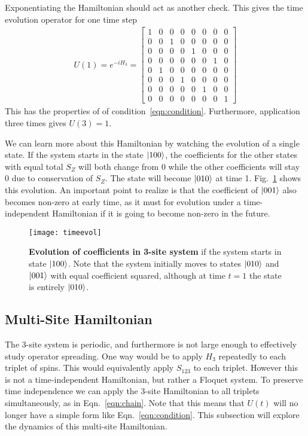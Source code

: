 Exponentiating the Hamiltonian should act as another check. This gives the time evolution operator for one time step
\begin{align}
U(1) = e^{-iH_3} = \begin{bmatrix}
1 & 0 & 0 & 0 & 0 & 0 & 0 & 0 \\
0 & 0 & 1 & 0 & 0 & 0 & 0 & 0 \\
0 & 0 & 0 & 0 & 1 & 0 & 0 & 0 \\
0 & 0 & 0 & 0 & 0 & 0 & 1 & 0 \\
0 & 1 & 0 & 0 & 0 & 0 & 0 & 0 \\
0 & 0 & 0 & 1 & 0 & 0 & 0 & 0 \\
0 & 0 & 0 & 0 & 0 & 1 & 0 & 0 \\
0 & 0 & 0 & 0 & 0 & 0 & 0 & 1
\end{bmatrix}
\end{align}
This has the properties of of condition~\ref{eqn:condition}. Furthermore, application three times gives $U(3) = 1$. 

We can learn more about this Hamiltonian by watching the evolution of a single state. If the system starts in the state $\left|100\right\rangle$, the coefficients for the other states with equal total $S_Z$ will both change from 0 while the other coefficients will stay 0 due to conservation of $S_Z$.
The state will become $\left|010\right\rangle$ at time 1. Fig.~\ref{fig:timeevol} shows this evolution. An important point to realize is that the coefficient of $\left|001\right\rangle$ also becomes non-zero at early time, as it must for evolution under a time-independent Hamiltonian if it is going to become non-zero in the future. 
\begin{figure}
	\centering
	\texttt{[image: timeevol]}
	\caption{\textbf{Evolution of coefficients in 3-site system} if the system starts in state $\left|100\right\rangle$. Note that the system initially moves to states $\left|010\right\rangle$ and $\left|001\right\rangle$ with equal coefficient squared, although at time $t=1$ the state is entirely $\left|010\right\rangle$.}
	\label{fig:timeevol}
\end{figure}

\subsection{Multi-Site Hamiltonian} \label{sub:multistate}

The 3-site system is periodic, and furthermore is not large enough to effectively study operator spreading. One way would be to apply $H_3$ repeatedly to each triplet of spins. This would equivalently apply $S_{123}$ to each triplet. However this is not a time-independent Hamiltonian, but rather a Floquet system. To preserve time independence we can apply the 3-site Hamiltonian to all triplets simultaneously, as in Eqn.~\ref{eqn:chain}. Note that this means that $U(t)$ will no longer have a simple form like Eqn.~\ref{eqn:condition}. This subsection will explore the dynamics of this multi-site Hamiltonian.

